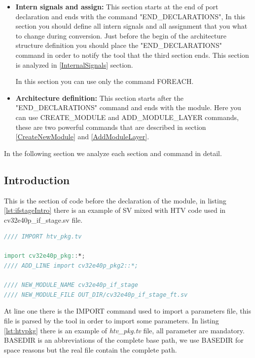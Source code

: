 {{\begin{itemize}
            \item \textbf{Intern signals and assign:} This section starts at the end of port declaration and ends with the command "END\_DECLARATIONS", In this section you should define all intern signals and all assignment that you what to change during conversion. Just before the begin of the architecture structure definition you should place the "END\_DECLARATIONS" command in order to notify the tool that the third section ends. This section is analyzed in \ref{InternalSignals} section.
            
            In this section you can use only the command FOREACH.
            
            \item \textbf{Architecture definition:} This section starts after the  "END\_DECLARATIONS" command and ends with the module. Here you can use CREATE\_MODULE and ADD\_MODULE\_LAYER commands, these are two powerful commands that are described in section \ref{CreateNewModule} and \ref{AddModuleLayer}.
            
        \end{itemize}
        
        In the following section we analyze each section and command in detail.
        
        \subsection{Introduction}{
            \label{Introduction}
            This is the section of code before the declaration of the module, in listing \ref{lst:ifstageIntro} there is an example of SV mixed with HTV code used in cv32e40p\_if\_stage.sv
            file.
            \begin{lstlisting}[basicstyle=\ttfamily\scriptsize, language=Verilog, caption=Introduction of cv32e40p if stage, label=lst:ifstageIntro]
//// IMPORT htv_pkg.tv

import cv32e40p_pkg::*;
//// ADD_LINE import cv32e40p_pkg2::*;

//// NEW_MODULE_NAME cv32e40p_if_stage
//// NEW_MODULE_FILE OUT_DIR/cv32e40p_if_stage_ft.sv
            \end{lstlisting}
           
            At line one there is the IMPORT command used to import a parameters file, this file is parsed by the tool in order to import some parameters. In listing \ref{lst:htvpkg} there is an example of \textit{htv\_pkg.tv} file, all parameter are mandatory. BASEDIR is an abbreviations of the complete base path, we use BASEDIR for space reasons but the real file contain the complete path. 
            
}}}
